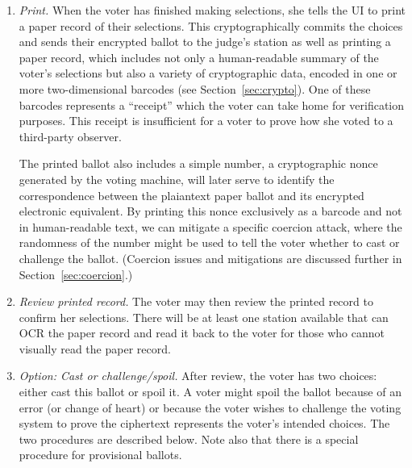 \begin{enumerate}
\item {\em Print.} When the voter has finished making selections, she
  tells the UI to print a paper record of their selections. This
  cryptographically commits the choices and sends their encrypted
  ballot to the judge's station as well as printing a paper record,
  which includes not only a human-readable summary of the voter's
  selections but also a variety of cryptographic data, encoded in one or more
  two-dimensional barcodes (see Section~\ref{sec:crypto}).
  One of these barcodes represents a ``receipt'' which the voter can
  take home for verification purposes. This receipt is insufficient for a
  voter to prove how she voted to a third-party observer.

  The printed ballot also includes a simple number,
  a cryptographic nonce generated by the voting machine, will later serve to identify the
  correspondence between the plaiantext paper ballot and its encrypted electronic equivalent.
  By printing this nonce exclusively as a barcode and not in human-readable
  text, we can mitigate a specific coercion attack, where the
  randomness of the number might be used to tell the voter whether to
  cast or challenge the ballot. (Coercion issues and mitigations are discussed further in Section~\ref{sec:coercion}.)

% 

\item {\em Review printed record.}
The voter may then review the printed record to confirm her selections. There will be at least one station available that can OCR the paper record and read it back to the voter for those who cannot visually read the paper record.

\item {\em Option: Cast or challenge/spoil.}
After review, the voter has two choices: either cast this ballot or spoil it. A voter might spoil the ballot because of an error (or change of heart) or because the voter wishes to challenge the voting system to prove the ciphertext represents the voter's intended choices. The two procedures are described below. Note also that there is a special procedure for provisional ballots.


\end{enumerate}
